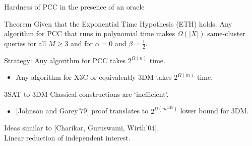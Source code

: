 \documentclass{beamer}
\begin{document}
\begin{frame}{Hardness of PCC in the presence of an oracle}
	\begin{block}{Theorem}
		Given that the Exponential Time Hypothesis (ETH) holds. Any algorithm for PCC that runs in polynomial time makes $\Omega(|X|)$ same-cluster queries for all $M \ge 3$ and for $\alpha = 0$ and $\beta = \frac{1}{2}$. 
	\end{block}
	\vspace{20pt}Strategy: Any algorithm for PCC takes $2^{\Omega(n)}$ time.
	\begin{itemize}
		\vspace{10pt}\item Any algorithm for X3C or equivalently 3DM takes $2^{\Omega(m)}$ time.
	\end{itemize}
\end{frame}

\begin{frame}{3SAT to 3DM}
	Classical constructions are `inefficient'.\\
	\begin{itemize}
	\vspace{10pt}\item \alert{[Johnson and Garey'79]} proof translates to $2^{\Omega(m^{0.25})}$ lower bound for 3DM.
	\end{itemize}
	\vspace{20pt}Ideas similar to \alert{[Charikar, Guruswami, Wirth'04]}.\\
	\vspace{20pt}Linear reduction of independent interest.	
\end{frame}
\end{document}
